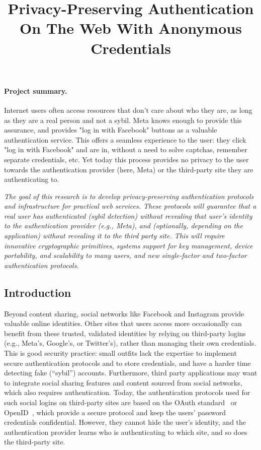 \documentclass[11pt]{article}
\title{Privacy-Preserving Authentication On The Web With Anonymous Credentials}
\date{}							%
\begin{document}
\maketitle

\vspace*{-6em}

\paragraph{Project summary.}
Internet users often access resources that don’t care about who they are, as long as they are a real person and not a sybil. Meta knows enough to provide this assurance, and provides "log in with Facebook" buttons as a valuable authentication service. This offers a seamless experience to the user: they click "log in with Facebook" and are in, without a need to solve captchas, remember separate credentials, etc. Yet today this process provides no privacy to the user towards the authentication provider (here, Meta) or the third-party site they are authenticating to.

\emph{The goal of this research is to develop privacy-preserving authentication protocols and infrastructure for practical web services. These protocols will guarantee that a real user has authenticated (sybil detection) without revealing that user’s identity to the authentication provider (e.g., Meta), and (optionally, depending on the application) without revealing it to the third party site. This will require innovative cryptographic primitives, systems support for key management, device portability, and scalability to many users, and new single-factor and two-factor authentication protocols.}

\subsection*{Introduction}
Beyond content sharing, social networks like Facebook and Instagram provide valuable online identities. Other sites that users access more occasionally can benefit from these trusted, validated identities by relying on third-party logins (e.g., Meta’s, Google’s, or Twitter’s), rather than managing their own credentials. This is good security practice: small outfits lack the expertise to implement secure authentication protocols and to store credentials, and have a harder time detecting fake (“sybil”) accounts. Furthermore, third party applications may want to integrate social sharing features and content sourced from social networks, which also requires authentication. Today, the authentication protocols used for such social logins on third-party sites are based on the OAuth standard~\cite{oauth2} or OpenID~\cite{openid}, which provide a secure protocol and keep the users' password credentials confidential. However, they cannot hide the user's identity, and the authentication provider learns who is authenticating to which site, and so does the third-party site.
\end{document}
